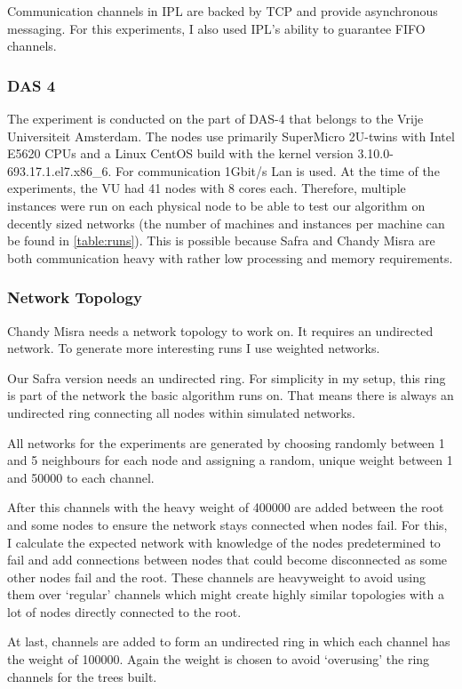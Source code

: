 Communication channels in IPL are backed by TCP and provide asynchronous messaging.
For this experiments, I also used IPL's ability to guarantee FIFO channels.

\subsubsection{DAS 4}
The experiment is conducted on the part of DAS-4 that belongs to the Vrije Universiteit Amsterdam.
The nodes use primarily SuperMicro 2U-twins with Intel E5620 CPUs and a Linux CentOS build with the kernel version 3.10.0-693.17.1.el7.x86\_6.
For communication 1Gbit/s Lan is used.
At the time of the experiments, the VU had 41 nodes with 8 cores each.
Therefore, multiple instances were run on each physical node to be able to test our algorithm on decently sized networks (the number of machines and instances per machine can be found in \cref{table:runs}).
This is possible because Safra and Chandy Misra are both communication heavy with rather low processing and memory requirements.

\subsubsection{Network Topology}
Chandy Misra needs a network topology to work on.
It requires an undirected network.
To generate more interesting runs I use weighted networks.

Our Safra version needs an undirected ring.
For simplicity in my setup, this ring is part of the network the basic algorithm runs on.
That means there is always an undirected ring connecting all nodes within simulated networks.

All networks for the experiments are generated by choosing randomly between 1 and 5 neighbours for each node and assigning a random, unique weight between 1 and 50000 to each channel.

After this channels with the heavy weight of 400000 are added between the root and some nodes to ensure the network stays connected when nodes fail.
For this, I calculate the expected network with knowledge of the nodes predetermined to fail and add connections between nodes that could become disconnected as some other nodes fail and the root.
These channels are heavyweight to avoid using them over `regular' channels which might create highly similar topologies with a lot of nodes directly connected to the root.

At last, channels are added to form an undirected ring in which each channel has the weight of 100000.
Again the weight is chosen to avoid `overusing' the ring channels for the trees built.


